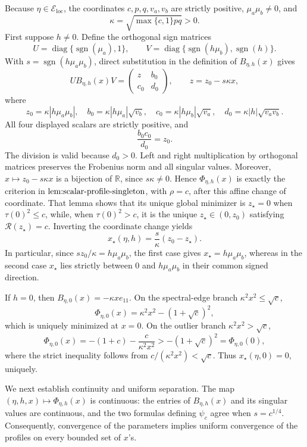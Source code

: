 Because \(\eta\in\mathcal E_{\mathrm{loc}}\), the coordinates \(c,p,q,v_a,v_b\) are strictly positive, \(\mu_a\mu_b\neq0\), and
\[
 \kappa=\sqrt{\max\{c,1\}pq}>0.
\]
First suppose \(h\neq0\).  Define the orthogonal sign matrices
\[
 U=\operatorname{diag}\{\operatorname{sgn}(\mu_a),1\},
 \qquad
 V=\operatorname{diag}\{\operatorname{sgn}(h\mu_b),\operatorname{sgn}(h)\}.
\]
With \(s=\operatorname{sgn}(h\mu_a\mu_b)\), direct substitution in the definition of \(B_{\eta,h}(x)\) gives
\[
 UB_{\eta,h}(x)V
 =\begin{pmatrix}z&b_0\\c_0&d_0\end{pmatrix},
 \qquad z=z_0-s\kappa x,
\]
where
\[
 z_0=\kappa|h\mu_a\mu_b|,
 \quad b_0=\kappa|h\mu_a|\sqrt{v_b},
 \quad c_0=\kappa|h\mu_b|\sqrt{v_a},
 \quad d_0=\kappa|h|\sqrt{v_av_b}.
\]
All four displayed scalars are strictly positive, and
\[
 \frac{b_0c_0}{d_0}=z_0.
\]
The division is valid because \(d_0>0\).  Left and right multiplication by orthogonal matrices preserves the Frobenius norm and all singular values.  Moreover, \(x\mapsto z_0-s\kappa x\) is a bijection of \(\mathbb R\), since \(s\kappa\neq0\).  Hence \(\Phi_{\eta,h}(x)\) is exactly the criterion in \(\textnormal{lem:scalar-profile-singleton}\), with \(\rho=c\), after this affine change of coordinate.  That lemma shows that its unique global minimizer is \(z_\star=0\) when \(\tau(0)^2\leq c\), while, when \(\tau(0)^2>c\), it is the unique \(z_\star\in(0,z_0)\) satisfying \(\mathcal R(z_\star)=c\).  Inverting the coordinate change yields
\[
 x_\star(\eta,h)=\frac{s}{\kappa}(z_0-z_\star).
\]
In particular, since \(sz_0/\kappa=h\mu_a\mu_b\), the first case gives \(x_\star=h\mu_a\mu_b\), whereas in the second case \(x_\star\) lies strictly between \(0\) and \(h\mu_a\mu_b\) in their common signed direction.

If \(h=0\), then \(B_{\eta,0}(x)=-\kappa xe_{11}\).  On the spectral-edge branch \(\kappa^2x^2\leq\sqrt c\),
\[
 \Phi_{\eta,0}(x)=\kappa^2x^2-(1+\sqrt c)^2,
\]
which is uniquely minimized at \(x=0\).  On the outlier branch \(\kappa^2x^2>\sqrt c\),
\[
 \Phi_{\eta,0}(x)=-(1+c)-\frac{c}{\kappa^2x^2}
 >-(1+\sqrt c)^2=\Phi_{\eta,0}(0),
\]
where the strict inequality follows from \(c/(\kappa^2x^2)<\sqrt c\).  Thus \(x_\star(\eta,0)=0\), uniquely.

We next establish continuity and uniform separation.  The map \((\eta,h,x)\mapsto\Phi_{\eta,h}(x)\) is continuous: the entries of \(B_{\eta,h}(x)\) and its singular values are continuous, and the two formulas defining \(\psi_c\) agree when \(s=c^{1/4}\).  Consequently, convergence of the parameters implies uniform convergence of the profiles on every bounded set of \(x\)'s.

